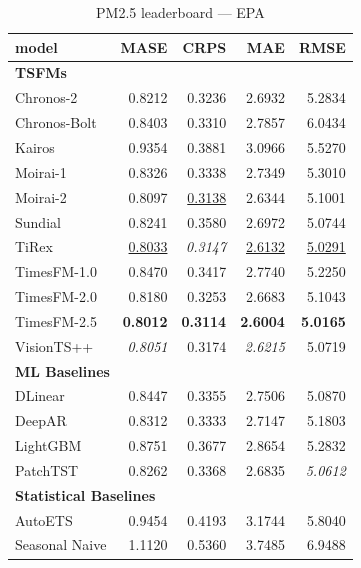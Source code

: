 \begin{table}[H]
\caption{PM2.5 leaderboard --- EPA}
\centering
\begin{small}
\begin{tabular}{lrrrr}
\toprule
model & MASE & CRPS & MAE & RMSE \\
\midrule
\multicolumn{5}{l}{\textbf{TSFMs}} \\
Chronos-2 & 0.8212 & 0.3236 & 2.6932 & 5.2834 \\
Chronos-Bolt & 0.8403 & 0.3310 & 2.7857 & 6.0434 \\
Kairos & 0.9354 & 0.3881 & 3.0966 & 5.5270 \\
Moirai-1 & 0.8326 & 0.3338 & 2.7349 & 5.3010 \\
Moirai-2 & 0.8097 & \underline{0.3138} & 2.6344 & 5.1001 \\
Sundial & 0.8241 & 0.3580 & 2.6972 & 5.0744 \\
TiRex & \underline{0.8033} & \textit{0.3147} & \underline{2.6132} & \underline{5.0291} \\
TimesFM-1.0 & 0.8470 & 0.3417 & 2.7740 & 5.2250 \\
TimesFM-2.0 & 0.8180 & 0.3253 & 2.6683 & 5.1043 \\
TimesFM-2.5 & \textbf{0.8012} & \textbf{0.3114} & \textbf{2.6004} & \textbf{5.0165} \\
VisionTS++ & \textit{0.8051} & 0.3174 & \textit{2.6215} & 5.0719 \\
\midrule
\multicolumn{5}{l}{\textbf{ML Baselines}} \\
DLinear & 0.8447 & 0.3355 & 2.7506 & 5.0870 \\
DeepAR & 0.8312 & 0.3333 & 2.7147 & 5.1803 \\
LightGBM & 0.8751 & 0.3677 & 2.8654 & 5.2832 \\
PatchTST & 0.8262 & 0.3368 & 2.6835 & \textit{5.0612} \\
\midrule
\multicolumn{5}{l}{\textbf{Statistical Baselines}} \\
AutoETS & 0.9454 & 0.4193 & 3.1744 & 5.8040 \\
Seasonal Naive & 1.1120 & 0.5360 & 3.7485 & 6.9488 \\
\bottomrule
\end{tabular}
\end{small}
\end{table}